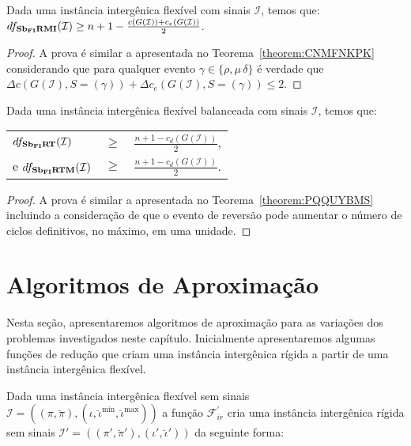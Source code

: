 \begin{theorem}\label{theorem:XQPRYMFX}
Dada uma instância intergênica flexível com sinais $\mathcal{I}$, temos que:\break $df_{\textbf{Sb\textsubscript{FI}RMI}}(\mathcal{I}) \ge {n+1} - \frac{c(G(\mathcal{I} )) + c_e(G(\mathcal{I} ))}{2}$.
\end{theorem}
\begin{proof}
A prova é similar a apresentada no Teorema~\ref{theorem:CNMFNKPK} considerando que para qualquer evento $\gamma \in \{\rho, \mu\,\delta\}$ é verdade que $\Delta c(G(\mathcal{I}), S=(\gamma)) + \Delta c_e(G(\mathcal{I}), S=(\gamma)) \le 2$.
\end{proof}

\begin{theorem}\label{theorem:HELIIGVZ}
Dada uma instância intergênica flexível balanceada com sinais $\mathcal{I}$, temos que:

\begin{tabular}{lll}
  $df_{\textbf{Sb\textsubscript{FI}RT}}(\mathcal{I})$     & $ \ge $ & $\frac{{n+1} - c_d(G(\mathcal{I} ))}{2}$, \\
  e $df_{\textbf{Sb\textsubscript{FI}RTM}}(\mathcal{I})$  & $ \ge $ & $\frac{{n+1} - c_d(G(\mathcal{I} ))}{2}$. \\
\end{tabular}
\end{theorem}
\begin{proof}
A prova é similar a apresentada no Teorema~\ref{theorem:PQQUYBMS} incluindo a consideração de que o evento de reversão pode aumentar o número de ciclos definitivos, no máximo, em uma unidade.
\end{proof}

\section{Algoritmos de Aproximação}

Nesta seção, apresentaremos algoritmos de aproximação para as variações dos problemas investigados neste capítulo. Inicialmente apresentaremos algumas funções de redução que criam uma instância intergênica rígida a partir de uma instância intergênica flexível.

Dada uma instância intergênica flexível sem sinais $\mathcal{I} = ((\pi,\breve\pi),(\iota,\breve\iota^{\min},\breve\iota^{\max}))$ a função $\mathcal{F}_{ir}^{'}$ cria uma instância intergênica rígida sem sinais $\mathcal{I'} = ((\pi',\breve\pi'),(\iota',\breve\iota'))$ da seguinte forma:

